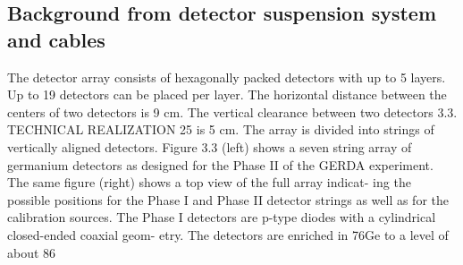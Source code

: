 \subsection{Background from detector suspension system and cables}
\label{sec:gerda:cable}
The detector array consists of hexagonally packed detectors with up to 5 layers. Up to 19 detectors can be placed per layer. The horizontal distance between the centers of two detectors is 9 cm. The vertical clearance between two detectors 3.3. TECHNICAL REALIZATION 25 is 5 cm. The array is divided into strings of vertically aligned detectors. Figure 3.3 (left) shows a seven string array of germanium detectors as designed for the Phase II of the GERDA experiment. The same figure (right) shows a top view of the full array indicat- ing the possible positions for the Phase I and Phase II detector strings as well as for the calibration sources.  The Phase I detectors are p-type diodes with a cylindrical closed-ended coaxial geom- etry. The detectors are enriched in 76Ge to a level of about 86%

